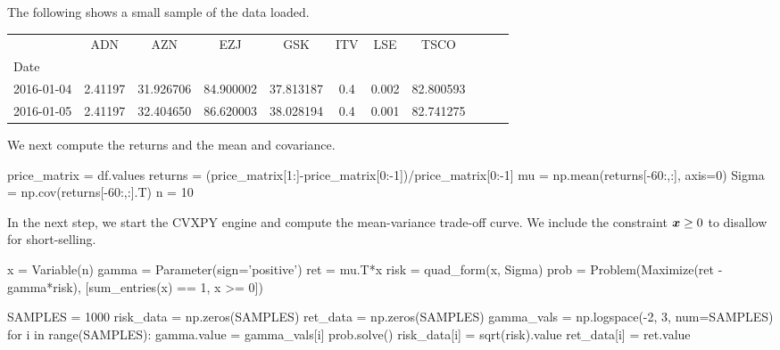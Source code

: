 The following shows a small sample of the data loaded.

\begin{tabular}{lcccccccccc}
 	   & ADN & AZN & EZJ & GSK & ITV & LSE & TSCO \\
Date & & & & & & & & & & \\ 										
2016-01-04 & 2.41197 & 31.926706 & 84.900002 & 37.813187 & 0.4 & 0.002 & 82.800593 \\
2016-01-05 & 2.41197 & 32.404650 & 86.620003 & 38.028194 & 0.4 & 0.001 & 82.741275 \\
\end{tabular}

We next compute the returns and the mean and covariance.

\begin{ipythonnb}
price_matrix = df.values
returns = (price_matrix[1:]-price_matrix[0:-1])/price_matrix[0:-1]
mu = np.mean(returns[-60:,:], axis=0)
Sigma = np.cov(returns[-60:,:].T)
n = 10
\end{ipythonnb}

In the next step, we start the CVXPY engine and compute the mean-variance trade-off curve. We include the constraint $\bm{x}\geq 0$ to disallow for short-selling.

\begin{ipythonnb}
x = Variable(n)
gamma = Parameter(sign='positive')
ret = mu.T*x
risk = quad_form(x, Sigma)
prob = Problem(Maximize(ret - gamma*risk), 
               [sum_entries(x) == 1, 
                x >= 0])
\end{ipythonnb}

\begin{ipythonnb}
SAMPLES = 1000
risk_data = np.zeros(SAMPLES)
ret_data = np.zeros(SAMPLES)
gamma_vals = np.logspace(-2, 3, num=SAMPLES)
for i in range(SAMPLES):
    gamma.value = gamma_vals[i]
    prob.solve()
    risk_data[i] = sqrt(risk).value
    ret_data[i] = ret.value
\end{ipythonnb}


